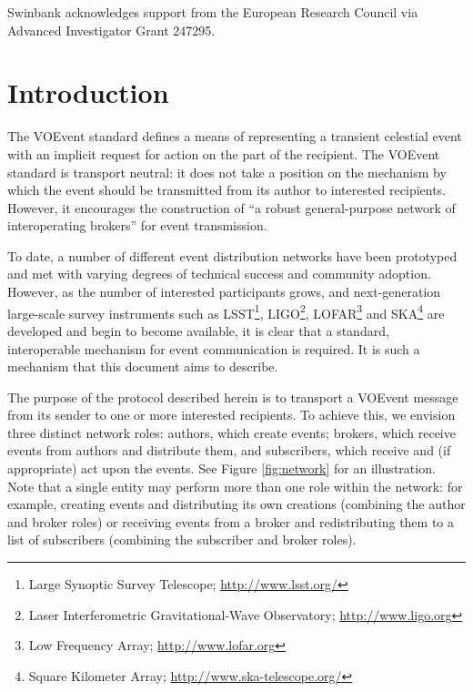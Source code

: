 \documentclass[a4paper,11pt]{ivoa}
\begin{document}
Swinbank acknowledges support from the European Research Council via Advanced
Investigator Grant 247295.

\newpage

\tableofcontents

\newpage

\section{Introduction}
\label{sec:intro}

The VOEvent standard \citep{Seaman:2011} defines a means of representing a
transient celestial event with an implicit request for action on the part of
the recipient. The VOEvent standard is transport neutral: it does not take a
position on the mechanism by which the event should be transmitted from its
author to interested recipients. However, it encourages the construction of “a
robust general-purpose network of interoperating brokers” for event
transmission.

To date, a number of different event distribution networks have been
prototyped and met with varying degrees of technical success and community
adoption. However, as the number of interested participants grows, and
next-generation large-scale survey instruments such as LSST\footnote{Large
Synoptic Survey Telescope; \url{http://www.lsst.org/}}, LIGO\footnote{Laser
Interferometric Gravitational-Wave Observatory; \url{http://www.ligo.org}},
LOFAR\footnote{Low Frequency Array; \url{http://www.lofar.org}} and
SKA\footnote{Square Kilometer Array; \url{http://www.ska-telescope.org/}} are
developed and begin to become available, it is clear that a standard,
interoperable mechanism for event communication is required. It is such a
mechanism that this document aims to describe.

The purpose of the protocol described herein is to transport a VOEvent message
from its sender to one or more interested recipients. To achieve this, we
envision three distinct network roles: authors, which create events; brokers,
which receive events from authors and distribute them, and subscribers, which
receive and (if appropriate) act upon the events. See Figure \ref{fig:network}
for an illustration. Note that a single entity may perform more than one role
within the network: for example, creating events and distributing its own
creations (combining the author and broker roles) or receiving events from a
broker and redistributing them to a list of subscribers (combining the
subscriber and broker roles).
\end{document}
